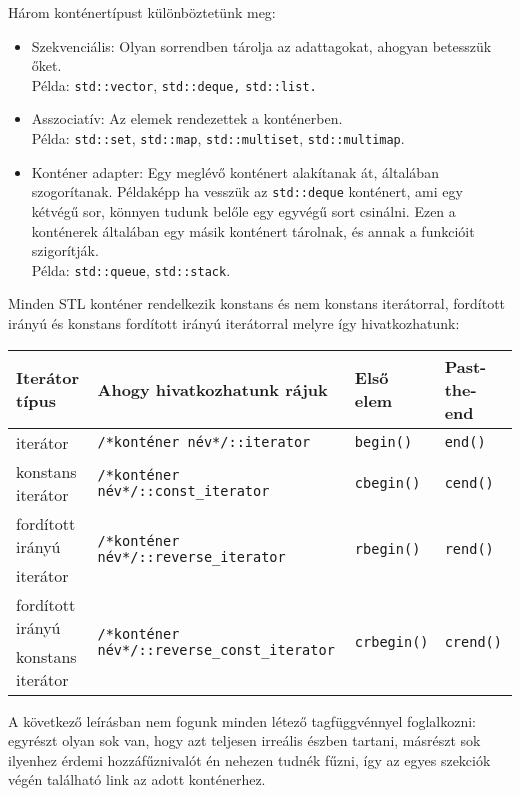 \documentclass[a4paper,11.5pt,table]{article}
\begin{document}
	Három konténertípust különböztetünk meg:
	\begin{itemize}
		\item Szekvenciális: Olyan sorrendben tárolja az adattagokat, ahogyan betesszük őket. \\Példa: \texttt{std::vector}, \texttt{std::deque,} \texttt{std::list.}
		\item Asszociatív: Az elemek rendezettek a konténerben.\\ Példa: \texttt{std::set}, \texttt{std::map}, \texttt{std::multiset}, \texttt{std::multimap}.
		\item Konténer adapter: Egy meglévő konténert alakítanak át, általában szogorítanak. Példaképp ha vesszük az \texttt{std::deque} konténert, ami egy kétvégű sor, könnyen tudunk belőle egy egyvégű sort csinálni. Ezen a konténerek általában egy másik konténert tárolnak, és annak a funkcióit szigorítják.
		\\Példa: \texttt{std::queue}, \texttt{std::stack}.
	\end{itemize}
	Minden STL konténer rendelkezik konstans és nem konstans iterátorral, fordított irányú és konstans fordított irányú iterátorral melyre így hivatkozhatunk:
	\begin{center}
		\begin{tabular}{|l|l|l|l|}
			\hline
			Iterátor típus&Ahogy hivatkozhatunk rájuk&Első elem&Past-the-end\\
			\hline
			\hline
			iterátor&\texttt{/*konténer név*/::iterator}&\texttt{begin()}&\texttt{end()}\\
			\hline
			konstans iterátor&\texttt{/*konténer név*/::const\_iterator}&\texttt{cbegin()}&\texttt{cend()}\\
			\hline
			fordított irányú&\multirow{2}{*}{\texttt{/*konténer név*/::reverse\_iterator}}&\multirow{2}{*}{\texttt{rbegin()}}&\multirow{2}{*}{\texttt{rend()}}\\
			iterátor&&&\\
			\hline
			fordított irányú&\multirow{2}{*}{\texttt{/*konténer név*/::reverse\_const\_iterator}}&\multirow{2}{*}{\texttt{crbegin()}}&\multirow{2}{*}{\texttt{crend()}}\\
			konstans iterátor&&&\\
			\hline
		\end{tabular}
	\end{center}
	
	A következő leírásban nem fogunk minden létező tagfüggvénnyel foglalkozni: egyrészt olyan sok van, hogy azt teljesen irreális észben tartani, másrészt sok ilyenhez érdemi hozzáfűznivalót én nehezen tudnék fűzni, így az egyes szekciók végén található link az adott konténerhez.
	
\end{document}
